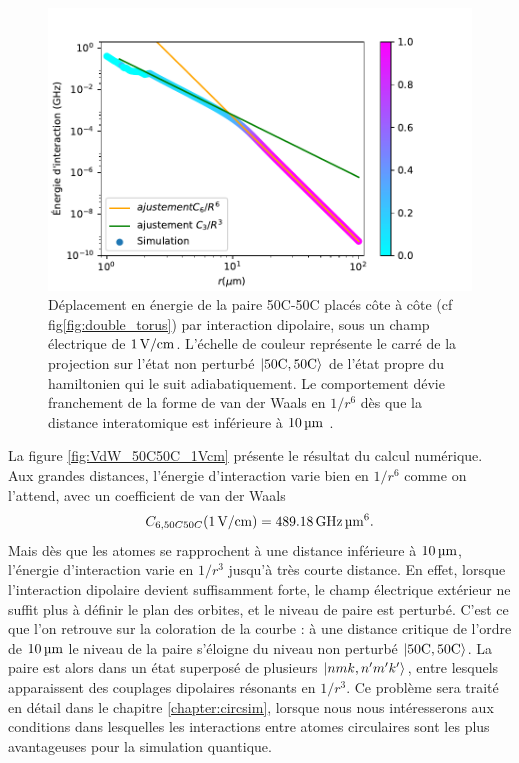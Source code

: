 \begin{figure}[!h]
\centering
\includegraphics[width=1\linewidth]{figures/theory/VdW_50C50C_1Vcm}
\caption[Interaction dipolaire 50C-50C]{Déplacement en énergie de la paire 50C-50C placés côte à côte (cf fig\eqref{fig:double_torus}) par interaction dipolaire, sous un champ électrique de $\SIvv{1}{\V / \cm}$. L'échelle de couleur représente le carré de la projection sur l'état non perturbé $\ket{50\text{C},50\text{C}}$ de l'état propre du hamiltonien qui le suit adiabatiquement.
Le comportement dévie franchement de la forme de van der Waals en $1/r^6$ dès que la distance interatomique est inférieure à $\SIv{10}{\micro\meter}$.
}
\label{fig:VdW_50C50C_1Vcm}
\end{figure}

La figure \eqref{fig:VdW_50C50C_1Vcm} présente le résultat du calcul numérique.
Aux grandes distances, l'énergie d'interaction varie bien en $1/r^6$ comme on l'attend, avec un coefficient de van der Waals 
\begin{equation}
\label{eq:C6_50C50C}
C_{6,50C50C}(\SIvv{1}{V/cm}) = \SI{489.18}{\GHz\raiseto{6}\um}.
\end{equation}
Mais dès que les atomes se rapprochent à une distance inférieure à $\SIvv{10}{\um}$, l'énergie d'interaction varie en $1/r^3$ jusqu'à très courte distance.
En effet, lorsque l'interaction dipolaire devient suffisamment forte, le champ électrique extérieur ne suffit plus à définir le plan des orbites, et le niveau de paire est perturbé.
C'est ce que l'on retrouve sur la coloration de la courbe : à une distance critique de l'ordre de $\SIvv{10}{\um}$ le niveau de la paire s'éloigne du niveau non perturbé $\ket{\mathrm{50C,50C}}$.
La paire est alors dans un état superposé de plusieurs $\ket{nmk,n'm'k'}$, entre lesquels apparaissent des couplages dipolaires résonants en $1/r^3$.
Ce problème sera traité en détail dans le chapitre \ref{chapter:circsim}, lorsque nous nous intéresserons aux conditions dans lesquelles les interactions entre atomes circulaires sont les plus avantageuses pour la simulation quantique.


